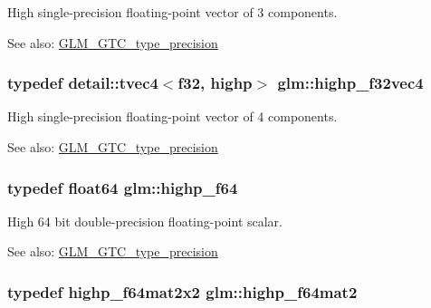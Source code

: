 High single-precision floating-point vector of 3 components. \begin{Desc}
\item[See also:]\hyperlink{group__gtc__type__precision}{GLM\_\-GTC\_\-type\_\-precision} \end{Desc}
\hypertarget{group__gtc__type__precision_g53d3c1a17e2e6f26ee5ad1e8879d710e}{
\subsubsection[highp\_\-f32vec4]{\setlength{\rightskip}{0pt plus 5cm}typedef detail::tvec4$<$f32, highp$>$ {\bf glm::highp\_\-f32vec4}}}
\label{group__gtc__type__precision_g53d3c1a17e2e6f26ee5ad1e8879d710e}


High single-precision floating-point vector of 4 components. \begin{Desc}
\item[See also:]\hyperlink{group__gtc__type__precision}{GLM\_\-GTC\_\-type\_\-precision} \end{Desc}
\hypertarget{group__gtc__type__precision_gb1306a5a8ae99fb2867b548b1546bbe0}{
\subsubsection[highp\_\-f64]{\setlength{\rightskip}{0pt plus 5cm}typedef float64 {\bf glm::highp\_\-f64}}}
\label{group__gtc__type__precision_gb1306a5a8ae99fb2867b548b1546bbe0}


High 64 bit double-precision floating-point scalar. \begin{Desc}
\item[See also:]\hyperlink{group__gtc__type__precision}{GLM\_\-GTC\_\-type\_\-precision} \end{Desc}
\hypertarget{group__gtc__type__precision_g7d9fd446fd43310ba6f63c8f9468acc0}{
\subsubsection[highp\_\-f64mat2]{\setlength{\rightskip}{0pt plus 5cm}typedef highp\_\-f64mat2x2 {\bf glm::highp\_\-f64mat2}}}
\label{group__gtc__type__precision_g7d9fd446fd43310ba6f63c8f9468acc0}


